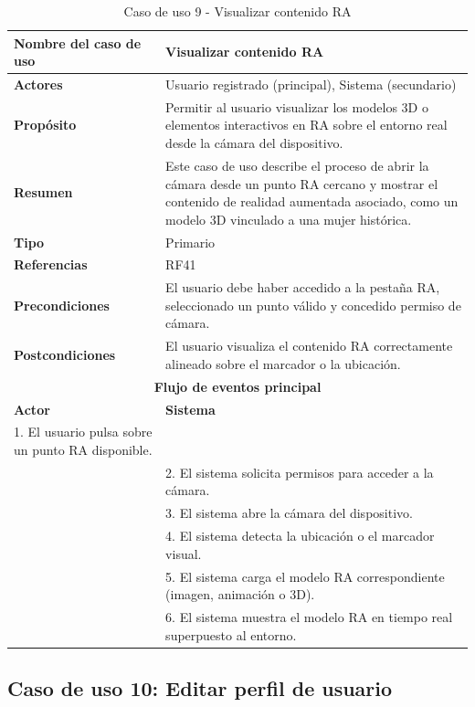 \begin{table}[H]
\centering
\caption{Caso de uso 9 - Visualizar contenido RA}
\begin{tabular}{|p{4.5cm}|p{10.5cm}|}
\hline
\textbf{Nombre del caso de uso} & Visualizar contenido RA \\
\hline
\textbf{Actores} & Usuario registrado (principal), Sistema (secundario) \\
\hline
\textbf{Propósito} & Permitir al usuario visualizar los modelos 3D o elementos interactivos en RA sobre el entorno real desde la cámara del dispositivo. \\
\hline
\textbf{Resumen} & Este caso de uso describe el proceso de abrir la cámara desde un punto RA cercano y mostrar el contenido de realidad aumentada asociado, como un modelo 3D vinculado a una mujer histórica. \\
\hline
\textbf{Tipo} & Primario \\
\hline
\textbf{Referencias} & RF41 \\
\hline
\textbf{Precondiciones} & El usuario debe haber accedido a la pestaña RA, seleccionado un punto válido y concedido permiso de cámara. \\
\hline
\textbf{Postcondiciones} & El usuario visualiza el contenido RA correctamente alineado sobre el marcador o la ubicación. \\
\hline
\multicolumn{2}{|c|}{\textbf{Flujo de eventos principal}} \\
\hline
\textbf{Actor} & \textbf{Sistema} \\
\hline
1. El usuario pulsa sobre un punto RA disponible. & \\
\hline
& 2. El sistema solicita permisos para acceder a la cámara. \\
\hline
& 3. El sistema abre la cámara del dispositivo. \\
\hline
& 4. El sistema detecta la ubicación o el marcador visual. \\
\hline
& 5. El sistema carga el modelo RA correspondiente (imagen, animación o 3D). \\
\hline
& 6. El sistema muestra el modelo RA en tiempo real superpuesto al entorno. \\
\hline
\end{tabular}
\end{table}

\subsection{Caso de uso 10: Editar perfil de usuario}

